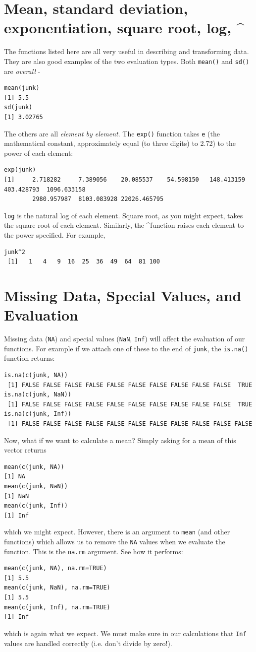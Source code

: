 \documentclass[11pt,letterpaper,fleqn]{report}
\begin{document}
\section{Mean, standard deviation, exponentiation, square root, log, \textasciicircum}
The functions listed here are all very useful in describing and transforming data. They are also good examples of the two evaluation types. Both \texttt{mean()} and \texttt{sd()} are \emph{overall} - 
\begin{verbatim}
mean(junk)
[1] 5.5
sd(junk)
[1] 3.02765
\end{verbatim}
The others are all \emph{element by element}. The \texttt{exp()} function takes \texttt{e} (the mathematical constant, approximately equal (to three digits) to 2.72) to the power of each element:
\begin{verbatim}
exp(junk)
[1]     2.718282     7.389056    20.085537    54.598150   148.413159   403.428793  1096.633158  
        2980.957987  8103.083928 22026.465795
\end{verbatim}
\texttt{log} is the natural log of each element. Square root, as you might expect, takes the square root of each element. Similarly, the \textasciicircum function raises each element to the power specified. For example,
\begin{verbatim}
junk^2
 [1]   1   4   9  16  25  36  49  64  81 100
\end{verbatim}
\section{Missing Data, Special Values, and Evaluation}
Missing data (\texttt{NA}) and special values (\texttt{NaN}, \texttt{Inf}) will affect the evaluation of our functions. For example if we attach one of these to the end of \texttt{junk}, the \texttt{is.na()} function returns:
\begin{verbatim}
is.na(c(junk, NA))
 [1] FALSE FALSE FALSE FALSE FALSE FALSE FALSE FALSE FALSE FALSE  TRUE
is.na(c(junk, NaN))
 [1] FALSE FALSE FALSE FALSE FALSE FALSE FALSE FALSE FALSE FALSE  TRUE
is.na(c(junk, Inf))
 [1] FALSE FALSE FALSE FALSE FALSE FALSE FALSE FALSE FALSE FALSE FALSE
\end{verbatim}
Now, what if we want to calculate a mean? Simply asking for a mean of this vector returns
\begin{verbatim}
mean(c(junk, NA))
[1] NA
mean(c(junk, NaN))
[1] NaN
mean(c(junk, Inf))
[1] Inf
\end{verbatim}
which we might expect. However, there is an argument to \texttt{mean} (and other functions) which allows us to remove the \texttt{NA} values when we evaluate the function. This is the \texttt{na.rm} argument. See how it performs:
\begin{verbatim}
mean(c(junk, NA), na.rm=TRUE)
[1] 5.5
mean(c(junk, NaN), na.rm=TRUE)
[1] 5.5
mean(c(junk, Inf), na.rm=TRUE)
[1] Inf
\end{verbatim} 
which is again what we expect. We must make sure in our calculations that \texttt{Inf} values are handled correctly (i.e. don't divide by zero!).
\end{document}

